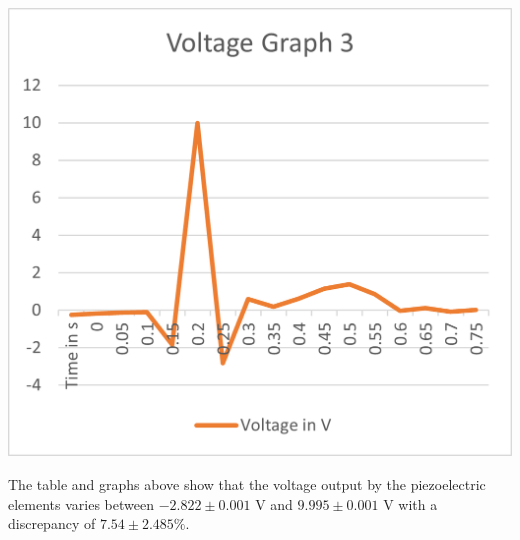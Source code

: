 \begin{minipage}{0.5\textwidth}
    \includegraphics[width=\textwidth]{./Figure_13.png}
    \label{fig:Voltage Graph 3}
\end{minipage}

\vspace{0.5cm}

The table and graphs above show that the voltage output by the piezoelectric elements varies between $-2.822 \pm 0.001$ V and $9.995 \pm 0.001$ V with a discrepancy of $7.54 \pm 2.485 \%$.\\

